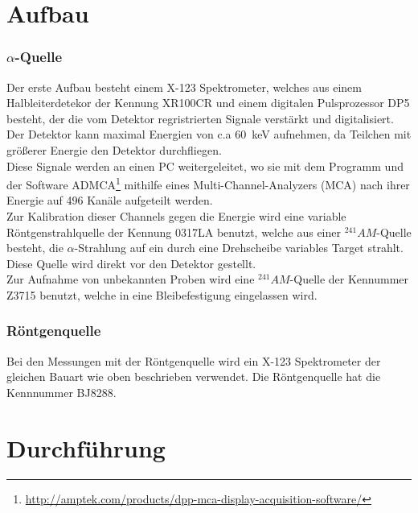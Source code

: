 \documentclass[12pt,a4paper]{article}
\begin{document}
\section{Aufbau}
\subsubsection{$\alpha$-Quelle}
Der erste Aufbau besteht einem X-123 Spektrometer, welches aus einem Halbleiterdetekor der Kennung XR100CR und einem digitalen Pulsprozessor DP5 besteht, der die vom Detektor regristrierten Signale verstärkt und digitalisiert. Der Detektor kann maximal Energien von c.a \SI{60}{keV} aufnehmen, da Teilchen mit größerer Energie den Detektor durchfliegen.\\
Diese Signale werden an einen PC weitergeleitet, wo sie mit dem Programm und der Software ADMCA\footnote{\url{http://amptek.com/products/dpp-mca-display-acquisition-software/}} mithilfe eines Multi-Channel-Analyzers (MCA) nach ihrer Energie auf 496 Kanäle aufgeteilt werden.\\
Zur Kalibration dieser Channels gegen die Energie wird eine variable Röntgenstrahlquelle der Kennung 0317LA benutzt, welche aus einer $^{241}AM$-Quelle besteht, die $\alpha$-Strahlung auf ein durch eine Drehscheibe variables Target strahlt. Diese Quelle wird direkt vor den Detektor gestellt.\\
Zur Aufnahme von unbekannten Proben wird eine $^{241}AM$-Quelle der Kennummer Z3715 benutzt, welche in eine Bleibefestigung eingelassen wird.
\subsubsection{Röntgenquelle}
Bei den Messungen mit der Röntgenquelle wird ein X-123 Spektrometer der gleichen Bauart wie oben beschrieben verwendet. Die Röntgenquelle hat die Kennnummer BJ8288.
\section{Durchführung}
\end{document}
